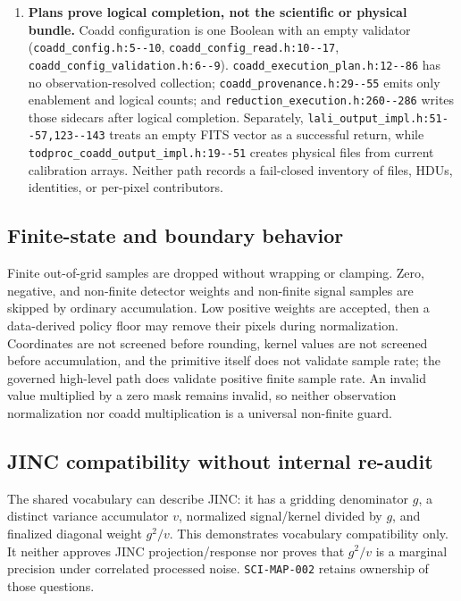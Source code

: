 \documentclass[11pt]{article}
\newcommand{\code}[1]{\nolinkurl{#1}}
\begin{document}
\begin{enumerate}[leftmargin=*,label=\arabic*.]
\item \textbf{Plans prove logical completion, not the scientific or physical
bundle.}  Coadd configuration is one Boolean with an empty validator
(\code{coadd_config.h:5--10}, \code{coadd_config_read.h:10--17},
\code{coadd_config_validation.h:6--9}).  \code{coadd_execution_plan.h:12--86}
has no observation-resolved collection; \code{coadd_provenance.h:29--55} emits
only enablement and logical counts; and
\code{reduction_execution.h:260--286} writes those sidecars after logical
completion.  Separately, \code{lali_output_impl.h:51--57,123--143} treats an
empty FITS vector as a successful return, while
\code{todproc_coadd_output_impl.h:19--51} creates physical files from current
calibration arrays.  Neither path records a fail-closed inventory of files,
HDUs, identities, or per-pixel contributors.
\end{enumerate}

\subsection{Finite-state and boundary behavior}

Finite out-of-grid samples are dropped without wrapping or clamping.  Zero,
negative, and non-finite detector weights and non-finite signal samples are
skipped by ordinary accumulation.  Low positive weights are accepted, then a
data-derived policy floor may remove their pixels during normalization.
Coordinates are not screened before rounding, kernel values are not screened
before accumulation, and the primitive itself does not validate sample rate;
the governed high-level path does validate positive finite sample rate.  An
invalid value multiplied by a zero mask remains invalid, so neither observation
normalization nor coadd multiplication is a universal non-finite guard.

\subsection{JINC compatibility without internal re-audit}

The shared vocabulary can describe JINC: it has a gridding denominator \(g\),
a distinct variance accumulator \(v\), normalized signal/kernel divided by
\(g\), and finalized diagonal weight \(g^2/v\).  This demonstrates vocabulary
compatibility only.  It neither approves JINC projection/response nor proves
that \(g^2/v\) is a marginal precision under correlated processed noise.
\code{SCI-MAP-002} retains ownership of those questions.
\end{document}
